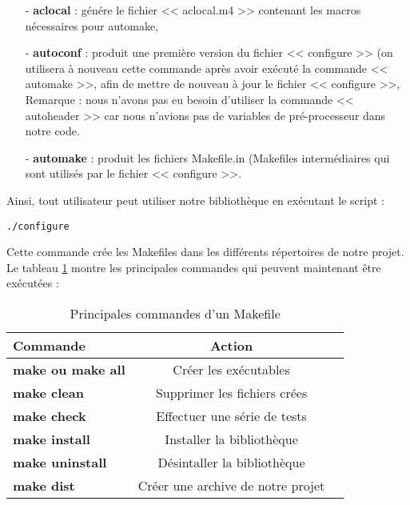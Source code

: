 \begin{itemize}
 \item [-] \textbf{aclocal} : g\'en\'ere le fichier << aclocal.m4 >> contenant les macros n\'ecessaires pour automake,
 \item [-] \textbf{autoconf} : produit une premi\`ere version du fichier << configure >> (on utilisera \`a nouveau cette commande apr\`es avoir ex\'ecut\'e 
la commande << automake >>, afin de mettre de nouveau \`a jour le fichier << configure >>,
\newline
Remarque : nous n'avons pas eu besoin  d'utiliser la commande << autoheader >> car nous n'avions pas de variables de pr\'e-processeur dans notre code.
 \item [-] \textbf{automake} : produit les fichiers Makefile.in (Makefiles interm\'ediaires qui sont utilis\'es par le fichier << configure >>.
\newline
\end{itemize}
Ainsi, tout utilisateur peut utiliser notre biblioth\`eque en ex\'ecutant le script :
\begin{verbatim}./configure\end{verbatim}
Cette commande cr\'ee les Makefiles dans les diff\'erents r\'epertoires de notre projet.
Le tableau \ref{tab:commandes} montre les principales commandes qui peuvent maintenant \^etre ex\'ecut\'ees :
\begin{table}[h]
\begin{center}

\begin{tabular}{|l|c|r|}
  \hline
  Commande &  Action\\
  \hline
  \textbf{make ou make all} & Cr\'eer les ex\'ecutables \\
  \textbf{make clean} & Supprimer les fichiers cr\'ees\\
  \textbf{make check} & Effectuer une s\'erie de tests \\
  \textbf{make install} & Installer la biblioth\`eque \\
  \textbf{make uninstall} & D\'esintaller la biblioth\`eque \\
  \textbf{make dist} & Cr\'eer une archive de notre projet \\
  \hline
\end{tabular}
\end{center}
\caption{Principales commandes d'un Makefile}
\label{tab:commandes}
\end{table}


